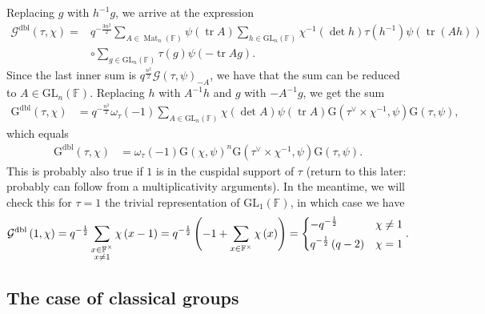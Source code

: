 \documentclass[12pt, reqno]{amsart}
\theoremstyle{definition}
\theoremstyle{definition}
\theoremstyle{definition}
\newcommand{\multiplicativegroup}[1]{#1^{\times}}
\newcommand{\fieldCharacter}{\psi}
\newcommand{\centralCharacter}[1]{\omega_{#1}}
\newcommand{\Contragradient}[1]{#1^{\vee}}
\newcommand{\trace}{\operatorname{tr}}
\newcommand{\GL}{\mathrm{GL}}
\newcommand{\finiteField}{\mathbb{F}}
\newcommand{\squareMatrix}{\operatorname{Mat}}
\newcommand{\GaussSum}[2]{\mathcal{G}\left(#1, #2\right)}
\newcommand{\dblGaussSum}[2]{\mathcal{G}^{\mathrm{dbl}}\left(#1, #2\right)}
\newcommand{\GaussSumScalar}[2]{\mathrm{G}\left(#1, #2\right)}
\newcommand{\dblGaussSumScalar}[2]{\mathrm{G}^{\mathrm{dbl}}\left(#1, #2\right)}
\begin{document}
Replacing $g$ with $h^{-1} g$, we arrive at the expression
\begin{align*}
	\dblGaussSum{\tau}{\chi} =& q^{-\frac{3n^2}{2}} \sum_{A \in \squareMatrix_n\left(\finiteField\right)} \fieldCharacter\left(\trace A\right) \sum_{h \in \GL_n\left(\finiteField\right)} \chi^{-1}\left(\det h\right) \tau\left(h^{-1}\right) \fieldCharacter\left(\trace\left(Ah\right)\right)\\
	& \circ \sum_{g \in \GL_n\left(\finiteField\right)} \tau\left(g\right) \fieldCharacter\left(-\trace Ag\right).
\end{align*}
Since the last inner sum is $q^{\frac{n^2}{2}} \GaussSum{\tau}{\fieldCharacter}_{-A}$, we have that the sum can be reduced to $A \in \GL_n\left(\finiteField\right)$. Replacing $h$ with $A^{-1} h$ and $g$ with $-A^{-1} g$, we get the sum
\begin{align*}
	\dblGaussSumScalar{\tau}{\chi} &= q^{-\frac{n^2}{2}} \centralCharacter{\tau}\left(-1\right) \sum_{A \in \GL_n\left(\finiteField\right)} \chi\left(\det A\right) \fieldCharacter\left(\trace A\right) \GaussSumScalar{\Contragradient{\tau} \times \chi^{-1}}{\fieldCharacter} \GaussSumScalar{\tau}{\fieldCharacter},
\end{align*}
which equals
\begin{align*}
	\dblGaussSumScalar{\tau}{\chi} &=  \centralCharacter{\tau}\left(-1\right) \GaussSumScalar{\chi}{\fieldCharacter}^n \GaussSumScalar{\Contragradient{\tau} \times \chi^{-1}}{\fieldCharacter} \GaussSumScalar{\tau}{\fieldCharacter}.
\end{align*}
This is probably also true if $1$ is in the cuspidal support of $\tau$ (return to this later: probably can follow from a multiplicativity arguments). In the meantime, we will check this for $\tau = 1$ the trivial representation of $\GL_1\left(\finiteField\right)$, in which case we have
$$\dblGaussSum{1}{\chi} = q^{-\frac{1}{2}} \sum_{\substack{x \in \multiplicativegroup{\finiteField} \\
		x \ne 1}} \chi\left(x - 1\right) = q^{-\frac{1}{2}}\left(-1 + \sum_{x \in \multiplicativegroup{\finiteField}} \chi\left(x\right) \right) = \begin{dcases}
		-q^{-\frac{1}{2}} & \chi \ne 1\\
		q^{-\frac{1}{2}} \left(q - 2\right) & \chi = 1
	\end{dcases}.$$

\subsection{The case of classical groups}
\end{document}
